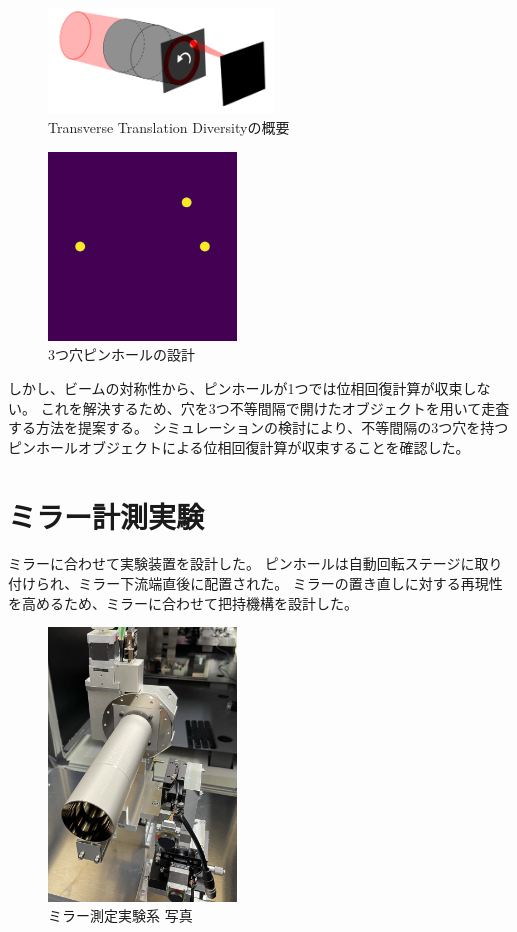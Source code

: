 \documentclass[a4j]{jarticle}
\begin{document}
\begin{figure}[!ht]
\centering
\includegraphics[width=6cm]{../thesis/chap3/figure/transverse_schematic.png}
\caption{Transverse Translation Diversityの概要}
\label{fig:transverse_schematic}
\end{figure}

\begin{figure}[!ht]
\centering
\includegraphics[width=5cm]{../thesis/chap3/figure/three_pinhole_mask.png}
\caption{3つ穴ピンホールの設計}
\label{fig:transverse_schematic}
\end{figure}

しかし、ビームの対称性から、ピンホールが1つでは位相回復計算が収束しない。
これを解決するため、穴を3つ不等間隔で開けたオブジェクトを用いて走査する方法を提案する。
シミュレーションの検討により、不等間隔の3つ穴を持つピンホールオブジェクトによる位相回復計算が収束することを確認した。

\section{ミラー計測実験}

ミラーに合わせて実験装置を設計した。
ピンホールは自動回転ステージに取り付けられ、ミラー下流端直後に配置された。
ミラーの置き直しに対する再現性を高めるため、ミラーに合わせて把持機構を設計した。

\begin{figure}[!ht]
\centering
\includegraphics[width=5cm]{../thesis/chap5/figure/photo_mirror_pinhole.png}
\caption{ミラー測定実験系 写真}
\label{fig:photo_mirror_experiment_mirror_and_pinhole}
\end{figure}
\end{document}
